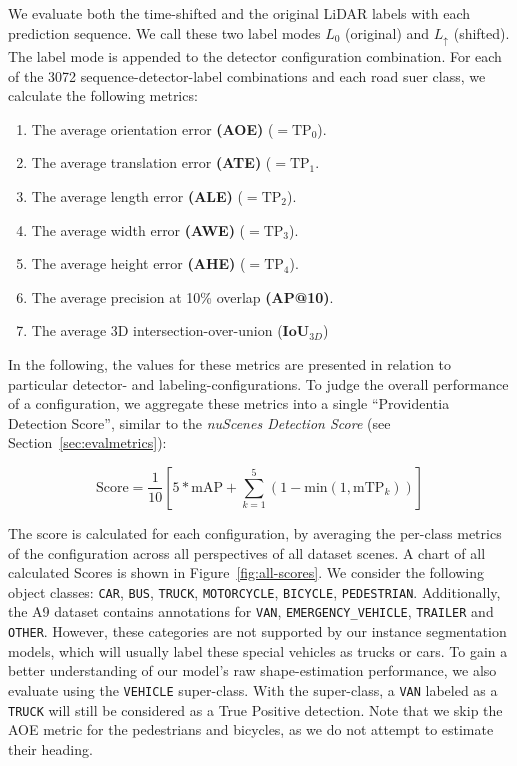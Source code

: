 We evaluate both the time-shifted and the original LiDAR labels with each prediction sequence.
We call these two label modes $L_0$ (original) and $L_{\uparrow}$ (shifted).
The label mode is appended to the detector configuration combination.
For each of the 3072 sequence-detector-label combinations and each road suer class, we calculate the following metrics:

\begin{enumerate}
    \item The average orientation error \textbf{(AOE)} ($=\text{TP}_0$).
    \item The average translation error \textbf{(ATE)} ($=\text{TP}_1$.
    \item The average length error \textbf{(ALE)} ($=\text{TP}_2$).
    \item The average width error \textbf{(AWE)} ($=\text{TP}_3$).
    \item The average height error \textbf{(AHE)} ($=\text{TP}_4$).
    \item The average precision at 10\% overlap \textbf{(AP@10)}.
    \item The average 3D intersection-over-union ($\mathbf{IoU}_{3D}$)
\end{enumerate}

In the following, the values for these metrics are presented in relation to particular detector- and labeling-configurations.
To judge the overall performance of a configuration, we aggregate these metrics into a single \enquote{Providentia Detection Score}, similar to the \textit{nuScenes Detection Score} (see Section~\ref{sec:evalmetrics}):

\[
    \text{Score} = \frac{1}{10} \left[5 * \text{mAP} + \sum^5_{k=1}(1-\text{min}(1, \text{mTP}_k))\right]
\]

The score is calculated for each configuration, by averaging the per-class metrics of the configuration across all perspectives of all dataset scenes.
A chart of all calculated Scores is shown in Figure~\ref{fig:all-scores}.
We consider the following object classes: \texttt{CAR}, \texttt{BUS}, \texttt{TRUCK}, \texttt{MOTORCYCLE}, \texttt{BICYCLE}, \texttt{PEDESTRIAN}.
Additionally, the A9 dataset contains annotations for \texttt{VAN}, \texttt{EMERGENCY\_VEHICLE}, \texttt{TRAILER} and \texttt{OTHER}.
However, these categories are not supported by our instance segmentation models, which will usually label these special vehicles as trucks or cars.
To gain a better understanding of our model's raw shape-estimation performance, we also evaluate using the \texttt{VEHICLE} super-class.
With the super-class, a \texttt{VAN} labeled as a \texttt{TRUCK} will still be considered as a True Positive detection.
Note that we skip the AOE metric for the pedestrians and bicycles, as we do not attempt to estimate their heading.

